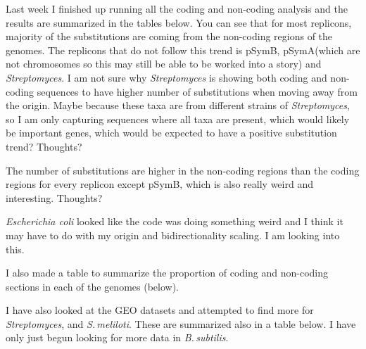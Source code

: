 \documentclass[12pt]{article}
\newcommand{\smel}{\textit{S.\,meliloti}\xspace}
\newcommand{\strep}{\textit{Streptomyces}\xspace}
\newcommand{\bass}{\textit{B.\,subtilis}\xspace}
\newcommand{\ecoli}{\textit{Escherichia coli}\xspace}
\newcommand{\pa}{pSymA\xspace}
\newcommand{\pb}{pSymB\xspace}
\begin{document}
Last week I finished up running all the coding and non-coding analysis and the results are summarized in the tables below.
You can see that for most replicons, majority of the substitutions are coming from the non-coding regions of the genomes.
The replicons that do not follow this trend is \pb, \pa (which are not chromosomes so this may still be able to be worked into a story) and \strep. 
I am not sure why \strep is showing both coding and non-coding sequences to have higher number of substitutions when moving away from the origin.
Maybe because these taxa are from different strains of \strep, so I am only capturing sequences where all taxa are present, which would likely be important genes, which would be expected to have a positive substitution trend?
Thoughts?

The number of substitutions are higher in the non-coding regions than the coding regions for every replicon except \pb, which is also really weird and interesting. Thoughts?

\ecoli looked like the code was doing something weird and I think it may have to do with my origin and bidirectionality scaling. I am looking into this.

I also made a table to summarize the proportion of coding and non-coding sections in each of the genomes (below).

I have also looked at the GEO datasets and attempted to find more for \strep, and \smel. These are summarized also in a table below.
I have only just begun looking for more data in \bass.

\end{document}
